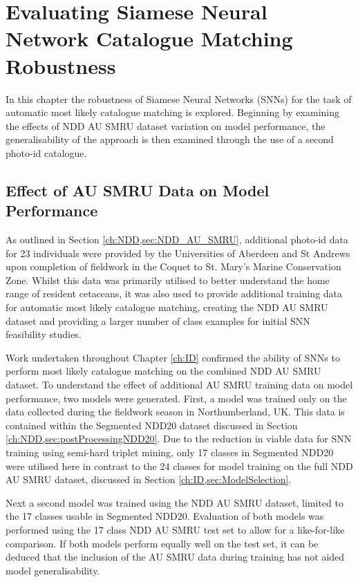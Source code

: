 \chapter{Evaluating Siamese Neural Network Catalogue Matching Robustness}\label{ch:SNNEvaluation}

In this chapter the robustness of Siamese Neural Networks (SNNs) for the task of automatic most likely catalogue matching is explored. Beginning by examining the effects of NDD AU SMRU dataset variation on model performance, the generalisability of the approach is then examined through the use of a second photo-id catalogue. 

\section{Effect of AU SMRU Data on Model Performance}\label{ch:SNNEvaluation,sec:EffectOfAUSMRU}

As outlined in Section \ref{ch:NDD,sec:NDD_AU_SMRU}, additional photo-id data for 23 individuals were provided by the Universities of Aberdeen and St Andrews upon completion of fieldwork in the Coquet to St. Mary's Marine Conservation Zone. Whilst this data was primarily utilised to better understand the home range of resident cetaceans, it was also used to provide additional training data for automatic most likely catalogue matching, creating the NDD AU SMRU dataset and providing a larger number of class examples for initial SNN feasibility studies. 

Work undertaken throughout Chapter \ref{ch:ID} confirmed the ability of SNNs to perform most likely catalogue matching on the combined NDD AU SMRU dataset. To understand the effect of additional AU SMRU training data on model performance, two models were generated. First, a model was trained only on the data collected during the fieldwork season in Northumberland, UK. This data is contained within the Segmented NDD20 dataset discussed in Section \ref{ch:NDD,sec:postProcessingNDD20}. Due to the reduction in viable data for SNN training using semi-hard triplet mining, only 17 classes in Segmented NDD20 were utilised here in contrast to the 24 classes for model training on the full NDD AU SMRU dataset, discussed in Section \ref{ch:ID,sec:ModelSelection}. 

Next a second model was trained using the NDD AU SMRU dataset, limited to the 17 classes usable in Segmented NDD20. Evaluation of both models was performed using the 17 class NDD AU SMRU test set to allow for a like-for-like comparison. If both models perform equally well on the test set, it can be deduced that the inclusion of the AU SMRU data during training has not aided model generalisability. 


